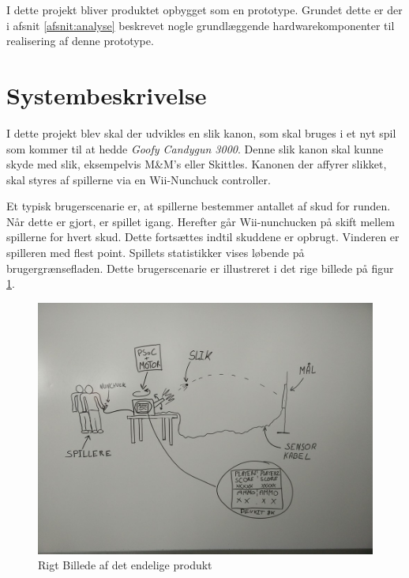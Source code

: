 \noindent I dette projekt bliver produktet opbygget som en prototype. Grundet dette er der i afsnit \ref{afsnit:analyse} beskrevet nogle grundlæggende hardwarekomponenter til realisering af denne prototype.


\section{Systembeskrivelse}
\label{afsnit:systembeskrivelse}
I dette projekt blev skal der udvikles en slik kanon, som skal bruges i et nyt spil som kommer til at hedde \textit{Goofy Candygun 3000}. Denne slik kanon skal kunne skyde med slik, eksempelvis M\&M’s eller Skittles. Kanonen der affyrer slikket, skal styres af spillerne via en Wii-Nunchuck controller.  \newline

\noindent Et typisk brugerscenarie er, at spillerne bestemmer antallet af skud for runden. Når dette er gjort, er spillet igang. Herefter går Wii-nunchucken på skift mellem spillerne for hvert skud. Dette fortsættes indtil skuddene er opbrugt. Vinderen er spilleren med flest point. Spillets statistikker vises løbende på brugergrænsefladen. Dette brugerscenarie er illustreret i det rige billede på figur \ref{fig:RigtBillede}.

\begin{figure}[H]
	\centering
	\includegraphics[width=\textwidth]{Projektformulering/images/rigtBillede}
	\caption{Rigt Billede af det endelige produkt}
	\label{fig:RigtBillede}
\end{figure}

